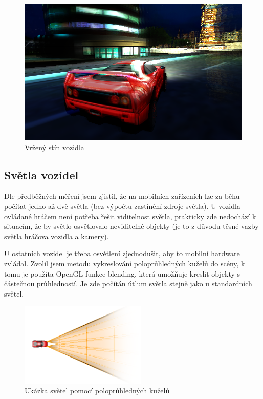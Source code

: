\documentclass[11pt,twoside,a4paper]{book}
\begin{document}
\begin{center}
\begin{figure}[h]
\includegraphics[width=120mm]{figures/nearshadow.png}
\caption{Vržený stín vozidla}
\end{figure}
\end{center}

\subsection{Světla vozidel}

Dle předběžných měření jsem zjistil, že na mobilních zařízeních lze za běhu počítat jedno až dvě světla (bez výpočtu zastínění zdroje světla). U vozidla ovládané hráčem není potřeba řešit viditelnost světla, prakticky zde nedochází k situacím, že by světlo osvětlovalo neviditelné objekty (je to z důvodu těsné vazby světla hráčova vozidla a kamery).

U ostatních vozidel je třeba osvětlení zjednodušit, aby to mobilní hardware zvládal. Zvolil jsem metodu vykreslování poloprůhledných kuželů do scény, k tomu je použita OpenGL funkce blending, která umožňuje kreslit objekty s částečnou průhledností. Je zde počítán útlum světla stejně jako u standardních světel.

\begin{center}
\begin{figure}[h]
\includegraphics[width=60mm]{figures/carlight.png}
\caption{Ukázka světel pomocí poloprůhledných kuželů}
\end{figure}
\end{center}
\end{document}
